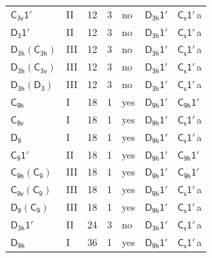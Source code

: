 \documentclass[10pt,a4paper]{article}
\numberwithin{equation}{section}
\newcommand{\grp}[1]{\mathsf{#1}}
\newcommand{\clsletter}[1]{\,{\scriptsize\color{black!55}#1}}
\begin{document}
{\begin{longtable}{@{}llrrlll@{}}
\href{C3v-1p.pdf}{$\grp{C_{3v}1'}$} & II & 12 & 3 & no & \href{D3h-1p.pdf}{$\grp{D_{3h}1'}$} & \href{C1v-1p.pdf}{$\grp{C_{s}1'}$}\clsletter{a}\\
\href{D3-1p.pdf}{$\grp{D_{3}1'}$} & II & 12 & 3 & no & \href{D3h-1p.pdf}{$\grp{D_{3h}1'}$} & \href{C1v-1p.pdf}{$\grp{C_{s}1'}$}\clsletter{a}\\
\href{D3h-C3h.pdf}{$\grp{D_{3h}}(\grp{C_{3h}})$} & III & 12 & 3 & no & \href{D3h-1p.pdf}{$\grp{D_{3h}1'}$} & \href{C1v-1p.pdf}{$\grp{C_{s}1'}$}\clsletter{a}\\
\href{D3h-C3v.pdf}{$\grp{D_{3h}}(\grp{C_{3v}})$} & III & 12 & 3 & no & \href{D3h-1p.pdf}{$\grp{D_{3h}1'}$} & \href{C1v-1p.pdf}{$\grp{C_{s}1'}$}\clsletter{a}\\
\href{D3h-D3.pdf}{$\grp{D_{3h}}(\grp{D_{3}})$} & III & 12 & 3 & no & \href{D3h-1p.pdf}{$\grp{D_{3h}1'}$} & \href{C1v-1p.pdf}{$\grp{C_{s}1'}$}\clsletter{a}\\
\href{../../../rotation/data/pdf/C9h.pdf}{$\grp{C_{9h}}$} & I & 18 & 1 & yes & \href{D9h-1p.pdf}{$\grp{D_{9h}1'}$} & \href{C9h-1p.pdf}{$\grp{C_{9h}1'}$}\\
\href{../../../rotation/data/pdf/C9v.pdf}{$\grp{C_{9v}}$} & I & 18 & 1 & yes & \href{D9h-1p.pdf}{$\grp{D_{9h}1'}$} & \href{C1v-1p.pdf}{$\grp{C_{s}1'}$}\clsletter{a}\\
\href{../../../rotation/data/pdf/D9.pdf}{$\grp{D_{9}}$} & I & 18 & 1 & yes & \href{D9h-1p.pdf}{$\grp{D_{9h}1'}$} & \href{C1v-1p.pdf}{$\grp{C_{s}1'}$}\clsletter{a}\\
\href{C9-1p.pdf}{$\grp{C_{9}1'}$} & II & 18 & 1 & yes & \href{D9h-1p.pdf}{$\grp{D_{9h}1'}$} & \href{C9h-1p.pdf}{$\grp{C_{9h}1'}$}\\
\href{C9h-C9.pdf}{$\grp{C_{9h}}(\grp{C_{9}})$} & III & 18 & 1 & yes & \href{D9h-1p.pdf}{$\grp{D_{9h}1'}$} & \href{C9h-1p.pdf}{$\grp{C_{9h}1'}$}\\
\href{C9v-C9.pdf}{$\grp{C_{9v}}(\grp{C_{9}})$} & III & 18 & 1 & yes & \href{D9h-1p.pdf}{$\grp{D_{9h}1'}$} & \href{C1v-1p.pdf}{$\grp{C_{s}1'}$}\clsletter{a}\\
\href{D9-C9.pdf}{$\grp{D_{9}}(\grp{C_{9}})$} & III & 18 & 1 & yes & \href{D9h-1p.pdf}{$\grp{D_{9h}1'}$} & \href{C1v-1p.pdf}{$\grp{C_{s}1'}$}\clsletter{a}\\
\href{D3h-1p.pdf}{$\grp{D_{3h}1'}$} & II & 24 & 3 & no & \href{D3h-1p.pdf}{$\grp{D_{3h}1'}$} & \href{C1v-1p.pdf}{$\grp{C_{s}1'}$}\clsletter{a}\\
\href{../../../rotation/data/pdf/D9h.pdf}{$\grp{D_{9h}}$} & I & 36 & 1 & yes & \href{D9h-1p.pdf}{$\grp{D_{9h}1'}$} & \href{C1v-1p.pdf}{$\grp{C_{s}1'}$}\clsletter{a}\\

\end{longtable}}
\end{document}
